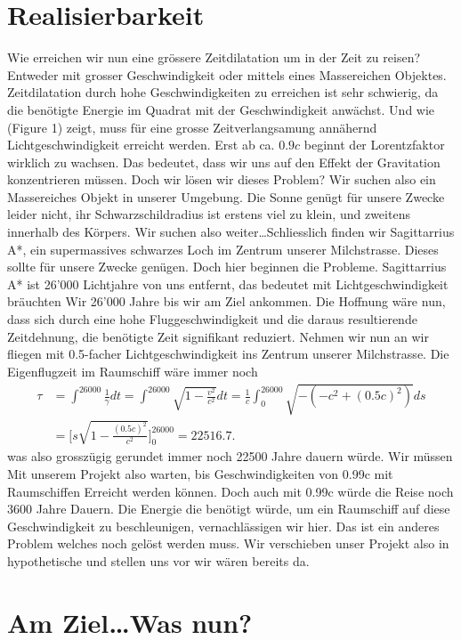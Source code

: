 \begin{refsection}
	\section{Realisierbarkeit}
	Wie erreichen wir nun eine grössere Zeitdilatation um in der Zeit zu reisen? Entweder mit grosser Geschwindigkeit oder mittels eines Massereichen Objektes. Zeitdilatation durch hohe Geschwindigkeiten zu erreichen ist sehr schwierig, da die benötigte Energie im Quadrat mit der Geschwindigkeit anwächst. Und wie (Figure 1) zeigt, muss für eine grosse Zeitverlangsamung annähernd Lichtgeschwindigkeit erreicht werden. Erst ab ca. $0.9c$ beginnt der Lorentzfaktor wirklich zu wachsen.
	Das bedeutet, dass wir uns auf den Effekt der Gravitation konzentrieren müssen.
	Doch wir lösen wir dieses Problem? Wir suchen also ein Massereiches Objekt in unserer Umgebung. Die Sonne genügt für unsere Zwecke leider nicht, ihr Schwarzschildradius ist erstens viel zu klein, und zweitens innerhalb des Körpers. Wir suchen also weiter\dots Schliesslich finden wir Sagittarrius A*, ein supermassives schwarzes Loch im Zentrum unserer Milchstrasse. Dieses sollte für unsere Zwecke genügen. 
	Doch hier beginnen die Probleme. 
	Sagittarrius A* ist 26'000 Lichtjahre von uns entfernt, das bedeutet mit Lichtgeschwindigkeit bräuchten Wir 26'000 Jahre bis wir am Ziel ankommen. Die Hoffnung wäre nun, dass sich durch eine hohe Fluggeschwindigkeit und die daraus resultierende Zeitdehnung, die benötigte Zeit signifikant reduziert. 
	Nehmen wir nun an wir fliegen mit 0.5-facher Lichtgeschwindigkeit ins Zentrum unserer Milchstrasse. Die Eigenflugzeit im Raumschiff wäre immer noch
	\begin{align*}
	\tau
	&= 
	\int_{}^{26000}\frac{1}{\gamma}dt=\int_{}^{26000}\sqrt{1-\frac{v^2}{c^2}}dt
	= 
	\frac{1}{c}\int_{0}^{26000}\sqrt{-(-c^2+(0.5c)^2)}ds\\
	&=
	\biggl[s\sqrt{1-\frac{(0.5c)^{2}}{c^2}}\biggr]_0^{26000}
	=
	22516.7.
	\end{align*}
	was also grosszügig gerundet immer noch 22500 Jahre dauern würde. 
	Wir müssen Mit unserem Projekt also warten, bis Geschwindigkeiten von 0.99c mit Raumschiffen Erreicht werden können. Doch auch mit 0.99c würde die Reise noch 3600 Jahre Dauern. Die Energie die benötigt würde, um ein Raumschiff auf diese Geschwindigkeit zu beschleunigen, vernachlässigen wir hier. Das ist ein anderes Problem welches noch gelöst werden muss.
	Wir verschieben unser Projekt also in hypothetische und stellen uns vor wir wären bereits da.
	
	\section{Am Ziel\dots Was nun?}
	

\end{refsection}

